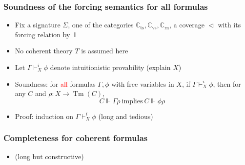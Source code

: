 \documentclass[handout,11pt]{beamer}
\newcommand{\red}[1]{\textcolor{red}{#1}}
\newcommand{\covd}{\mathrel{\vartriangleleft}}
\newcommand*{\subvs}{_{\mathrm{vs}}}
\newcommand*{\subrn}{_{\mathrm{rn}}}
\newcommand*{\subts}{_{\mathrm{ts}}}
\newcommand{\Cvs}{\mathbb{C}\subvs}
\newcommand{\Crn}{\mathbb{C}\subrn}
\newcommand{\Cts}{\mathbb{C}\subts}
\DeclareMathOperator{\Tm}{Tm}
\begin{document}
\begin{frame}
\frametitle{Soundness of the forcing semantics for all formulas}
\begin{itemize}[<+->]
 \item Fix a signature $\Sigma$, one of the categories $\Cts,\Cvs,\Crn$, 
 a coverage $\covd$ with its forcing relation by $\Vdash$
 \item No coherent theory $T$ is assumed here
 \item Let $\Gamma\vdash_X^i \phi$ denote intuitionistic 
 provability (explain $X$) 
 \item Soundness: for \red{all} formulas $\Gamma,\phi$ 
 with free variables in $X$, if $\Gamma\vdash_X^i \phi$, then for any $C$
 and $\rho: X\to\Tm(C)$, 
 $$C\Vdash \Gamma\rho~\text{implies}~C\Vdash \phi\rho$$
 \item Proof: induction on $\Gamma\vdash_X^i \phi$ (long and tedious)
 \end{itemize}
\end{frame}

\begin{frame}
\frametitle{Completeness for coherent formulas}
 \begin{itemize}[<+->]
    \item (long but constructive)
 \end{itemize}
\end{frame}
\end{document}
